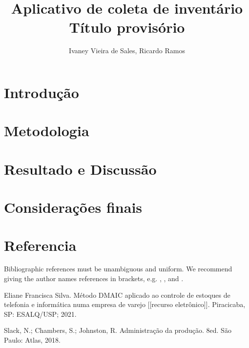 \documentclass[12pt]{article}
\title{Aplicativo de coleta de inventário\\ Título provisório}
\author{Ivaney Vieira de Sales\inst{1}, Ricardo Ramos\inst{2}}
\begin{document}
 

\maketitle

\begin{resumo}

  
  
\end{resumo}

\begin{abstract}

  

\end{abstract}

\section{Introdução}



\section{Metodologia}



\section{Resultado e Discussão}



\section{Considerações finais}



\section{Referencia}



Bibliographic references must be unambiguous and uniform.  We recommend giving
the author names references in brackets, e.g. \cite{knuth:84},
\cite{boulic:91}, and \cite{smith:99}.

Eliane Francisca Silva. Método DMAIC aplicado ao controle de estoques de telefonia e informática numa empresa de varejo [[recurso eletrônico]]. Piracicaba, SP: ESALQ/USP; 2021.

Slack, N.; Chambers, S.; Johnston, R. Administração da produção. 8ed. São Paulo: Atlas, 2018.



\end{document}
